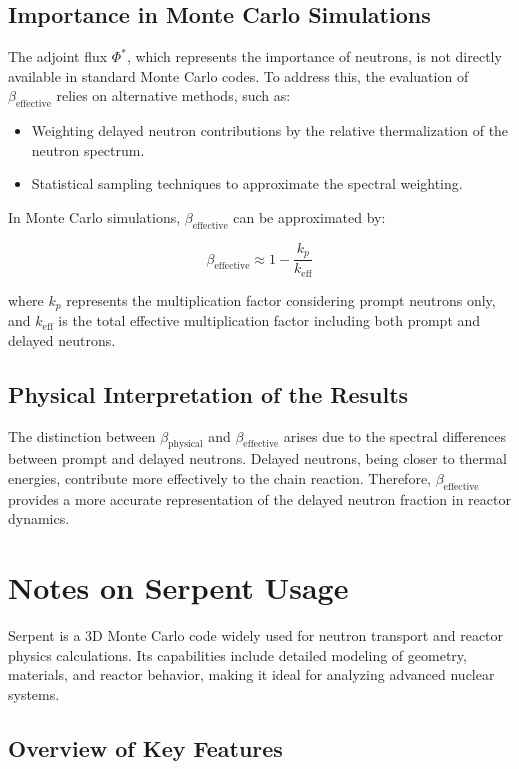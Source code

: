\subsection{Importance in Monte Carlo Simulations}

The adjoint flux $\Phi^*$, which represents the importance of neutrons, is not directly available in standard Monte Carlo codes. To address this, the evaluation of $\beta_{\text{effective}}$ relies on alternative methods, such as:
\begin{itemize}
    \item Weighting delayed neutron contributions by the relative thermalization of the neutron spectrum.
    \item Statistical sampling techniques to approximate the spectral weighting.
\end{itemize}

In Monte Carlo simulations, $\beta_{\text{effective}}$ can be approximated by:

\[
\beta_{\text{effective}} \approx 1 - \frac{k_p}{k_{\text{eff}}}
\]

where $k_p$ represents the multiplication factor considering prompt neutrons only, and $k_{\text{eff}}$ is the total effective multiplication factor including both prompt and delayed neutrons.

\subsection{Physical Interpretation of the Results}

The distinction between $\beta_{\text{physical}}$ and $\beta_{\text{effective}}$ arises due to the spectral differences between prompt and delayed neutrons. Delayed neutrons, being closer to thermal energies, contribute more effectively to the chain reaction. Therefore, $\beta_{\text{effective}}$ provides a more accurate representation of the delayed neutron fraction in reactor dynamics.


\section{Notes on Serpent Usage}

Serpent is a 3D Monte Carlo code widely used for neutron transport and reactor physics calculations. Its capabilities include detailed modeling of geometry, materials, and reactor behavior, making it ideal for analyzing advanced nuclear systems.

\subsection{Overview of Key Features}

